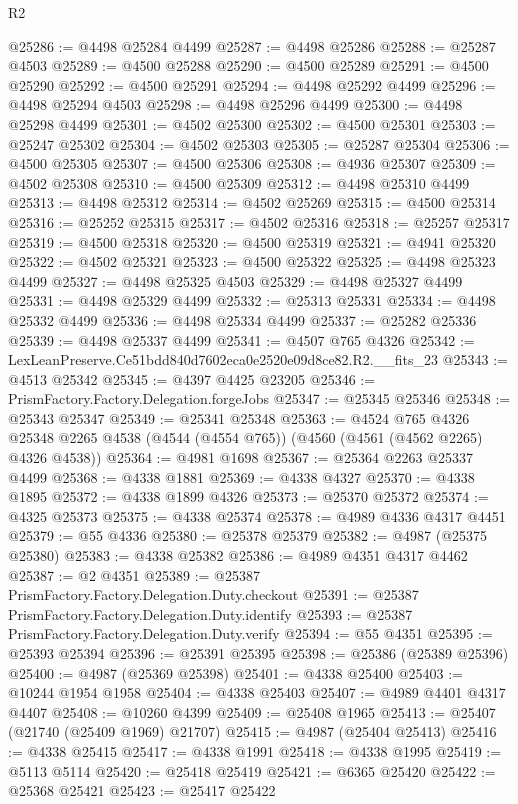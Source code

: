\begin{lexlean}{R2}
\begin{coremodule}
@25286 := @4498 @25284 @4499
@25287 := @4498 @25286
@25288 := @25287 @4503
@25289 := @4500 @25288
@25290 := @4500 @25289
@25291 := @4500 @25290
@25292 := @4500 @25291
@25294 := @4498 @25292 @4499
@25296 := @4498 @25294 @4503
@25298 := @4498 @25296 @4499
@25300 := @4498 @25298 @4499
@25301 := @4502 @25300
@25302 := @4500 @25301
@25303 := @25247 @25302
@25304 := @4502 @25303
@25305 := @25287 @25304
@25306 := @4500 @25305
@25307 := @4500 @25306
@25308 := @4936 @25307
@25309 := @4502 @25308
@25310 := @4500 @25309
@25312 := @4498 @25310 @4499
@25313 := @4498 @25312
@25314 := @4502 @25269
@25315 := @4500 @25314
@25316 := @25252 @25315
@25317 := @4502 @25316
@25318 := @25257 @25317
@25319 := @4500 @25318
@25320 := @4500 @25319
@25321 := @4941 @25320
@25322 := @4502 @25321
@25323 := @4500 @25322
@25325 := @4498 @25323 @4499
@25327 := @4498 @25325 @4503
@25329 := @4498 @25327 @4499
@25331 := @4498 @25329 @4499
@25332 := @25313 @25331
@25334 := @4498 @25332 @4499
@25336 := @4498 @25334 @4499
@25337 := @25282 @25336
@25339 := @4498 @25337 @4499
@25341 := @4507 @765 @4326
@25342 := LexLeanPreserve.Ce51bdd840d7602eca0e2520e09d8ce82.R2.__fits_23
@25343 := @4513 @25342
@25345 := @4397 @4425 @23205
@25346 := PrismFactory.Factory.Delegation.forgeJobs
@25347 := @25345 @25346
@25348 := @25343 @25347
@25349 := @25341 @25348
@25363 := @4524
    @765
    @4326
    @25348
    @2265
    @4538
    (@4544 (@4554 @765))
    (@4560 (@4561 (@4562 @2265) @4326 @4538))
@25364 := @4981 @1698
@25367 := @25364 @2263 @25337 @4499
@25368 := @4338 @1881
@25369 := @4338 @4327
@25370 := @4338 @1895
@25372 := @4338 @1899 @4326
@25373 := @25370 @25372
@25374 := @4325 @25373
@25375 := @4338 @25374
@25378 := @4989 @4336 @4317 @4451
@25379 := @55 @4336
@25380 := @25378 @25379
@25382 := @4987 (@25375 @25380)
@25383 := @4338 @25382
@25386 := @4989 @4351 @4317 @4462
@25387 := @2 @4351
@25389 := @25387 PrismFactory.Factory.Delegation.Duty.checkout
@25391 := @25387 PrismFactory.Factory.Delegation.Duty.identify
@25393 := @25387 PrismFactory.Factory.Delegation.Duty.verify
@25394 := @55 @4351
@25395 := @25393 @25394
@25396 := @25391 @25395
@25398 := @25386 (@25389 @25396)
@25400 := @4987 (@25369 @25398)
@25401 := @4338 @25400
@25403 := @10244 @1954 @1958
@25404 := @4338 @25403
@25407 := @4989 @4401 @4317 @4407
@25408 := @10260 @4399
@25409 := @25408 @1965
@25413 := @25407 (@21740 (@25409 @1969) @21707)
@25415 := @4987 (@25404 @25413)
@25416 := @4338 @25415
@25417 := @4338 @1991
@25418 := @4338 @1995
@25419 := @5113 @5114
@25420 := @25418 @25419
@25421 := @6365 @25420
@25422 := @25368 @25421
@25423 := @25417 @25422

\end{coremodule}
\end{lexlean}
